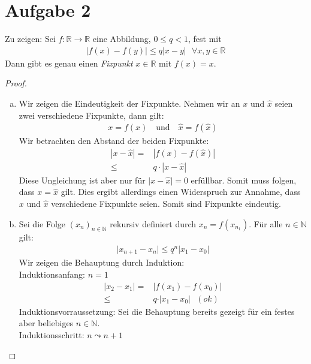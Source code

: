 \documentclass{scrreprt}
\newcommand{\NN}{\mathbb{N}}
\newcommand{\RR}{\mathbb{R}}
\begin{document}
    \section*{Aufgabe 2}
    Zu zeigen: Sei $f \colon \RR \to \RR$ eine Abbildung, $0 \leq q < 1$, fest mit
    		\begin{align*}
    			\vert f(x) - f(y) \vert \leq q \vert x - y \vert ~~~ \forall x,y \in \RR
    		\end{align*}
    Dann gibt es genau einen \emph{Fixpunkt} $x \in \RR$ mit $f(x) = x$.
    \begin{proof}\\
    \begin{enumerate}[(a)]
    	\item
    		Wir zeigen die Eindeutigkeit der Fixpunkte. Nehmen wir an $x$ und $\hat{x}$ seien zwei verschiedene Fixpunkte, dann gilt:
    		\begin{align*}
    			x = f(x) ~~~ \text{ und } ~~~ \hat{x} = f(\hat{x})
    		\end{align*}
    		Wir betrachten den Abstand der beiden Fixpunkte:
    		\begin{align*}
    			\left\vert x - \hat{x} \right\vert = & \left\vert f(x) - f(\hat{x}) \right\vert\\
    			\leq & q \cdot \left\vert x - \hat{x}\right\vert
    		\end{align*}
    		Diese Ungleichung ist aber nur für $\vert x - \hat{x}\vert = 0$ erfüllbar. Somit muss folgen, dass $x = \hat{x}$ gilt. Dies ergibt allerdings einen Widerspruch zur Annahme, dass $x$ und $\hat{x}$ verschiedene Fixpunkte seien. Somit sind Fixpunkte eindeutig. 
    	\item
    		Sei die Folge $(x_n)_{n \in \NN}$ rekursiv definiert durch $x_n = f(x_{n_1})$. Für alle $n \in \NN$ gilt:
    		\begin{align*}
    			\vert x_{n+1} - x_n \vert \leq q^n \vert x_1 - x_0 \vert
    		\end{align*}
    		Wir zeigen die Behauptung durch Induktion:\\
    		Induktionsanfang: $n = 1$
    		\begin{align*}
    			\vert x_{2} - x_1 \vert = & \vert f(x_1) - f(x_0) \vert\\
    			\leq & q \cdot \vert x_1 - x_0 \vert ~~~ (ok)
    		\end{align*}
    		Induktionsvorraussetzung: Sei die Behauptung bereits gezeigt für ein festes aber beliebiges $n \in \NN$.\\
            Induktionsschritt: $n \leadsto n+1$

\end{enumerate}
\end{proof}
\end{document}

